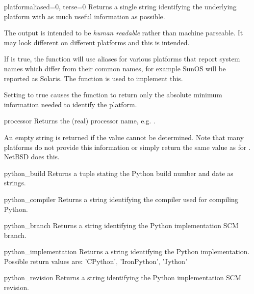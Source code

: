 \begin{funcdesc}{platform}{aliased=0, terse=0}
  Returns a single string identifying the underlying platform
  with as much useful information as possible.

  The output is intended to be \emph{human readable} rather than
  machine parseable. It may look different on different platforms and
  this is intended.

  If  is true, the function will use aliases for various
  platforms that report system names which differ from their common
  names, for example SunOS will be reported as Solaris.  The
   function is used to implement this.

  Setting  to true causes the function to return only the
  absolute minimum information needed to identify the platform.
\end{funcdesc}

\begin{funcdesc}{processor}{}
  Returns the (real) processor name, e.g. .

  An empty string is returned if the value cannot be determined. Note
  that many platforms do not provide this information or simply return
  the same value as for .  NetBSD does this.
\end{funcdesc}

\begin{funcdesc}{python_build}{}
  Returns a tuple  stating the
  Python build number and date as strings.
\end{funcdesc}

\begin{funcdesc}{python_compiler}{}
  Returns a string identifying the compiler used for compiling Python.
\end{funcdesc}

\begin{funcdesc}{python_branch}{}
  Returns a string identifying the Python implementation SCM branch.
\end{funcdesc}

\begin{funcdesc}{python_implementation}{}
  Returns a string identifying the Python implementation.
  Possible return values are: 'CPython', 'IronPython', 'Jython'
\end{funcdesc}

\begin{funcdesc}{python_revision}{}
  Returns a string identifying the Python implementation SCM revision.
\end{funcdesc}

